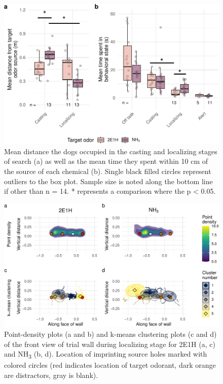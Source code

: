 \documentclass[
]{article}
\begin{document}
\begin{figure}
\centering
\includegraphics{main-manuscript_files/figure-latex/hole-times-1.pdf}
\caption{\label{fig:hole-times}Mean distance the dogs occupied in the casting and localizing stages of search (a) as well as the mean time they spent within 10 cm of the source of each chemical (b). Single black filled circles represent outliers to the box plot. Sample size is noted along the bottom line if other than n = 14. * represents a comparison where the p \textless{} 0.05.}
\end{figure}

\begin{figure}
\centering
\includegraphics{main-manuscript_files/figure-latex/frontwall-detailing-1.pdf}
\caption{\label{fig:frontwall-detailing}Point-density plots (a and b) and k-means clustering plots (c and d) of the front view of trial wall during localizing stage for 2E1H (a, c) and NH\textsubscript{3} (b, d). Location of imprinting source holes marked with colored circles (red indicates location of target odorant, dark orange are distractors, gray is blank).}
\end{figure}
\end{document}
